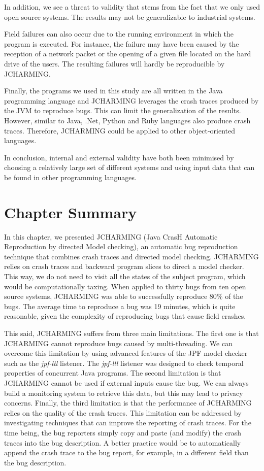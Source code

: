 \documentclass[12pt]{report}
\begin{document}
In addition, we see a threat to validity that stems from the fact that
we only used open source systems. The results may not be generalizable
to industrial systems.

Field failures can also occur due to the running environment in which
the program is executed. For instance, the failure may have been caused
by the reception of a network packet or the opening of a given file
located on the hard drive of the users. The resulting failures will
hardly be reproducible by JCHARMING.

Finally, the programs we used in this study are all written in the Java
programming language and JCHARMING leverages the crash traces produced
by the JVM to reproduce bugs. This can limit the generalization of the
results. However, similar to Java, .Net, Python and Ruby languages also
produce crash traces. Therefore, JCHARMING could be applied to other
object-oriented languages.

In conclusion, internal and external validity have both been minimised
by choosing a relatively large set of different systems and using input
data that can be found in other programming languages.

\section{\texorpdfstring{Chapter
Summary\label{sec:conclusion}}{Chapter Summary}}\label{chapter-summary-4}

In this chapter, we presented JCHARMING (Java CrasH Automatic
Reproduction by directed Model checking), an automatic bug reproduction
technique that combines crash traces and directed model checking.
JCHARMING relies on crash traces and backward program slices to direct a
model checker. This way, we do not need to visit all the states of the
subject program, which would be computationally taxing. When applied to
thirty bugs from ten open source systems, JCHARMING was able to
successfully reproduce 80\% of the bugs. The average time to reproduce a
bug was 19 minutes, which is quite reasonable, given the complexity of
reproducing bugs that cause field crashes.

This said, JCHARMING suffers from three main limitations. The first one
is that JCHARMING cannot reproduce bugs caused by multi-threading. We
can overcome this limitation by using advanced features of the JPF model
checker such as the \emph{jpf-ltl} listener. The \emph{jpf-ltl} listener
was designed to check temporal properties of concurrent Java programs.
The second limitation is that JCHARMING cannot be used if external
inputs cause the bug. We can always build a monitoring system to
retrieve this data, but this may lead to privacy concerns. Finally, the
third limitation is that the performance of JCHARMING relies on the
quality of the crash traces. This limitation can be addressed by
investigating techniques that can improve the reporting of crash traces.
For the time being, the bug reporters simply copy and paste (and modify)
the crash traces into the bug description. A better practice would be to
automatically append the crash trace to the bug report, for example, in
a different field than the bug description.
\end{document}
